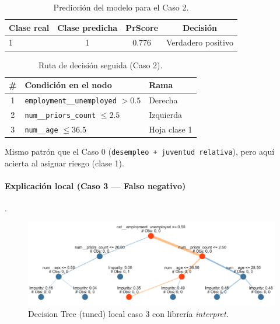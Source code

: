 \begin{table}[h!]
\centering
\caption{Predicción del modelo para el Caso 2.}
\label{tab:local-pred-caso2}
\small
\begin{tabular}{@{}lccc@{}}
\toprule
\textbf{Clase real} & \textbf{Clase predicha} & \textbf{PrScore} & \textbf{Decisión} \\
\midrule
1 & 1 & 0.776 & Verdadero positivo \\
\bottomrule
\end{tabular}
\end{table}

\begin{table}[h!]
\centering
\caption{Ruta de decisión seguida (Caso 2).}
\label{tab:local-path-caso2}
\small
\begin{tabular}{@{}cll@{}}
\toprule
\# & \textbf{Condición en el nodo} & \textbf{Rama} \\
\midrule
1 & \texttt{employment\_\_unemployed} \(> 0.5\) & Derecha \\
2 & \texttt{num\_\_priors\_count} \(\le 2.5\)   & Izquierda \\
3 & \texttt{num\_\_age} \(\le 36.5\)            & Hoja clase 1 \\
\bottomrule
\end{tabular}
\end{table}

Mismo patrón que el Caso 0 (\texttt{desempleo + juventud relativa}), pero aquí acierta al asignar riesgo (clase 1).

\paragraph{Explicación local (Caso 3 — Falso negativo)}.

\begin{figure}[h!]
  \centering
  \includegraphics[width=0.92\linewidth]{figures/decision_tree_tunned_depth_local2.png}
  \caption{Decision Tree (tuned) local caso 3 con librería \textit{interpret}.}
  \label{fig:tree-tuned_local3}
\end{figure}


